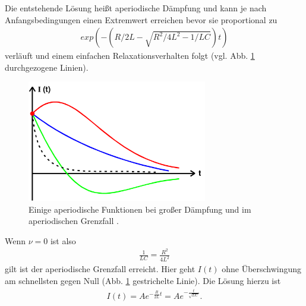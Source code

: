Die entstehende Lösung heißt aperiodische Dämpfung und kann je nach Anfangsbedingungen einen Extremwert erreichen bevor sie
proportional zu
\begin{align*}
    exp \left(-  \left( R/2L - \sqrt{R^2 / 4 L^2 - 1/LC} \right) t \right)
\end{align*}
verläuft und einem einfachen Relaxationsverhalten folgt (vgl. Abb. \ref{fig:Abfall_Funktionen} durchgezogene Linien).
\begin{figure}
    \centering
    \includegraphics[width=0.7\textwidth]{Abbildungen/Abfall_Funktionen.png}
    \caption{Einige aperiodische Funktionen bei großer Dämpfung und im aperiodischen Grenzfall \cite{man:v354}.}
    \label{fig:Abfall_Funktionen}
\end{figure}
Wenn $\stackrel{~}{\nu} = 0$ ist also
\begin{align}
    \frac{1}{LC} = \frac{R^2}{4L^2}
    \label{eq:ap_bed}
\end{align}
gilt ist der aperiodische Grenzfall erreicht.
Hier geht $I(t)$ ohne Überschwingung am schnellsten gegen Null (Abb. \ref{fig:Abfall_Funktionen} gestrichelte Linie).
Die Lösung hierzu ist
\begin{align}
    I(t) = A e^{- \frac{R}{2L} t} = A e^{- \frac{t}{\sqrt{LC}}} .
    \label{eq:Aperiodischer_Grenzfall}
\end{align}